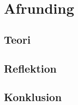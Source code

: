 \documentclass[../main]{subfiles}
\begin{document}
\chapter{Afrunding}

\section{Teori}

\section{Reflektion}

\section{Konklusion}
\end{document}
